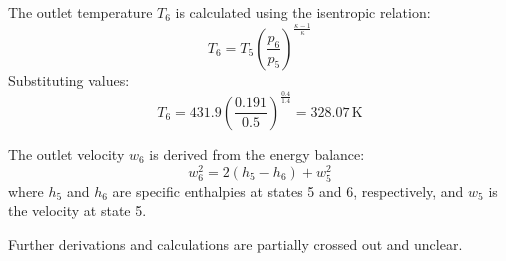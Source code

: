 The outlet temperature \( T_6 \) is calculated using the isentropic relation:  
\[
T_6 = T_5 \left( \frac{p_6}{p_5} \right)^{\frac{\kappa - 1}{\kappa}}
\]  
Substituting values:  
\[
T_6 = 431.9 \left( \frac{0.191}{0.5} \right)^{\frac{0.4}{1.4}} = 328.07 \, \text{K}
\]  

The outlet velocity \( w_6 \) is derived from the energy balance:  
\[
w_6^2 = 2 \left( h_5 - h_6 \right) + w_5^2
\]  
where \( h_5 \) and \( h_6 \) are specific enthalpies at states 5 and 6, respectively, and \( w_5 \) is the velocity at state 5.  

Further derivations and calculations are partially crossed out and unclear.
